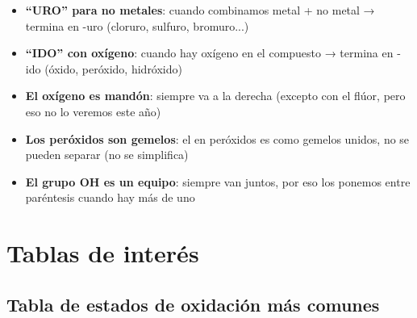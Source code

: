 \begin{itemize}
    \item \textbf{``URO'' para no metales}: cuando combinamos metal + no metal → termina en -uro (cloruro, sulfuro, bromuro...)

    \item \textbf{``IDO'' con oxígeno}: cuando hay oxígeno en el compuesto → termina en -ido (óxido, peróxido, hidróxido)

    \item \textbf{El oxígeno es mandón}: siempre va a la derecha (excepto con el flúor, pero eso no lo veremos este año)

    \item \textbf{Los peróxidos son gemelos}: el  en peróxidos es como gemelos unidos, no se pueden separar (no se simplifica)

    \item \textbf{El grupo OH es un equipo}: siempre van juntos, por eso los ponemos entre paréntesis cuando hay más de uno
\end{itemize}

\newpage


\section{Tablas de interés}

\subsection{Tabla de estados de oxidación más comunes}

